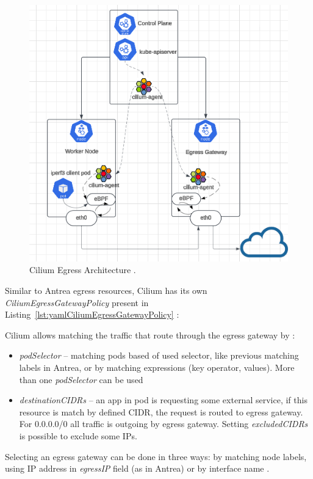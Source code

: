 \begin{figure}[tbh]
    \centering
    \includegraphics[width=0.9\columnwidth]{images/cilium_egress.png}
    \caption{Cilium Egress Architecture \cite{CiliumUseCases}.}
    \label{fig:ciliumEgressArch}
\end{figure}

Similar to Antrea egress resources, Cilium has its own \textit{CiliumEgressGatewayPolicy} present in Listing~\ref{lst:yamlCiliumEgressGatewayPolicy} \cite{CiliumDocs}:

Cilium allows matching the traffic that route through the egress gateway by \cite{CiliumDocs}:
\begin{itemize}
    \item \textit{podSelector} -- matching pods based of used selector, like previous matching labels in Antrea, or by matching expressions (key operator, values). More than one \textit{podSelector} can be used
    \item \textit{destinationCIDRs} -- an app in pod is requesting some external service, if this resource is match by defined CIDR, the request is routed to egress gateway. For 0.0.0.0/0 all traffic is outgoing by egress gateway. Setting \textit{excludedCIDRs} is possible to exclude some IPs.
\end{itemize}

Selecting an egress gateway can be done in three ways: by matching node labels, using IP address in \textit{egressIP} field (as in Antrea) or by interface name \cite{CiliumDocs}. 

